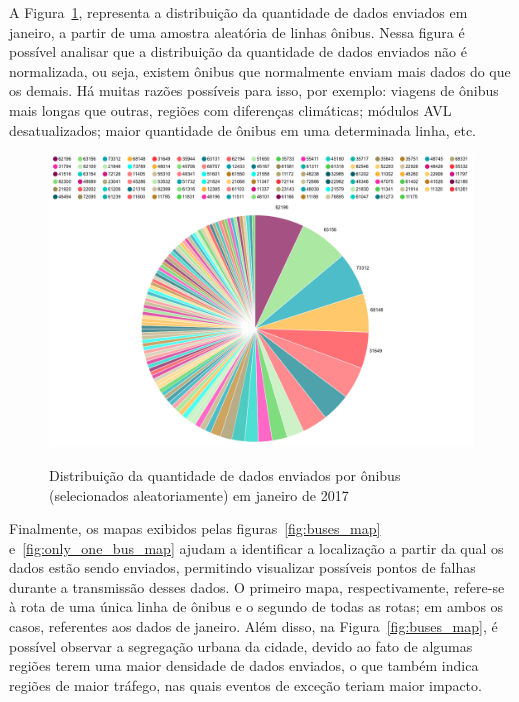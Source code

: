 \documentclass[
	12pt,				%
	oneside,			%
	a4paper,			%
	english,			%
	brazil				%
	]{abntex2ppgsi}
\begin{document}
{{{A Figura~\ref{fig:pizza_bus}, representa a distribuição da quantidade de dados enviados em janeiro, a partir de uma amostra aleatória de linhas ônibus. Nessa figura é possível analisar que a distribuição da quantidade de dados enviados não é normalizada, ou seja, existem ônibus que normalmente enviam mais dados do que os demais. Há muitas razões possíveis para isso, por exemplo: viagens de ônibus mais longas que outras, regiões com diferenças climáticas; módulos AVL desatualizados; maior quantidade de ônibus em uma determinada linha, etc.

\begin{figure}[!htb]%
	\centering
 	  \caption{Distribuição da quantidade de dados enviados por ônibus (selecionados aleatoriamente) em janeiro de 2017}
		\includegraphics[width=1\linewidth]{images/pizza_bus.png}
	\label{fig:pizza_bus}
\end{figure}

Finalmente, os mapas exibidos pelas figuras~\ref {fig:buses_map} e~\ref{fig:only_one_bus_map} ajudam a identificar a localização a partir da qual os dados estão sendo enviados, permitindo visualizar possíveis pontos de falhas durante a transmissão desses dados. O primeiro mapa, respectivamente, refere-se à rota de uma única linha de ônibus e o segundo de todas as rotas; em ambos os casos, referentes aos dados de janeiro. Além disso, na Figura~\ref {fig:buses_map}, é possível observar a segregação urbana da cidade, devido ao fato de algumas regiões terem uma maior densidade de dados enviados, o que também indica regiões de maior tráfego, nas quais eventos de exceção teriam maior impacto.

}}}
\end{document}
